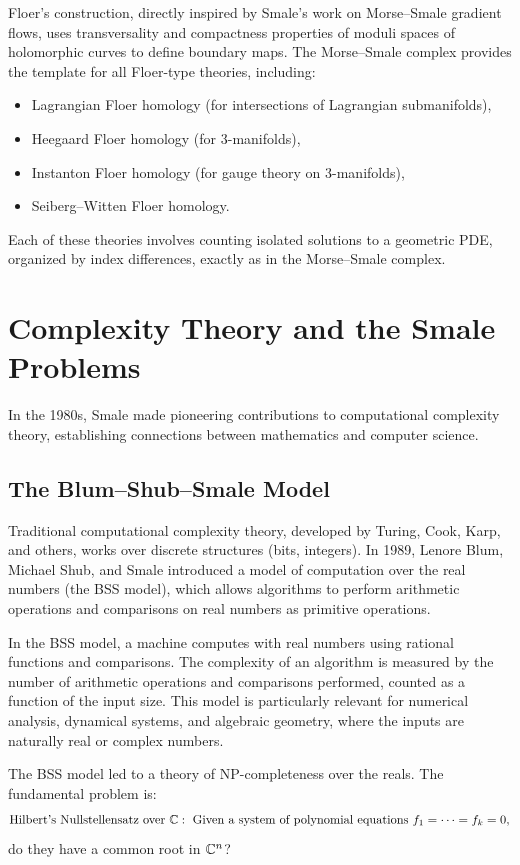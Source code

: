 Floer's construction, directly inspired by Smale's work on Morse--Smale gradient flows, uses transversality and compactness properties of moduli spaces of holomorphic curves to define boundary maps. The Morse--Smale complex provides the template for all Floer-type theories, including:
\begin{itemize}
    \item Lagrangian Floer homology (for intersections of Lagrangian submanifolds),
    \item Heegaard Floer homology (for 3-manifolds),
    \item Instanton Floer homology (for gauge theory on 3-manifolds),
    \item Seiberg--Witten Floer homology.
\end{itemize}

Each of these theories involves counting isolated solutions to a geometric PDE, organized by index differences, exactly as in the Morse--Smale complex.

\section{Complexity Theory and the Smale Problems}

In the 1980s, Smale made pioneering contributions to computational complexity theory, establishing connections between mathematics and computer science.

\subsection{The Blum--Shub--Smale Model}

Traditional computational complexity theory, developed by Turing, Cook, Karp, and others, works over discrete structures (bits, integers). In 1989, Lenore Blum, Michael Shub, and Smale introduced a model of computation over the real numbers (the BSS model), which allows algorithms to perform arithmetic operations and comparisons on real numbers as primitive operations.

In the BSS model, a machine computes with real numbers using rational functions and comparisons. The complexity of an algorithm is measured by the number of arithmetic operations and comparisons performed, counted as a function of the input size. This model is particularly relevant for numerical analysis, dynamical systems, and algebraic geometry, where the inputs are naturally real or complex numbers.

The BSS model led to a theory of NP-completeness over the reals. The fundamental problem is:
\[
\text{Hilbert's Nullstellensatz over } \mathbb{C}: \text{ Given a system of polynomial equations } f_1 = \cdots = f_k = 0,
\]
do they have a common root in \(\mathbb{C}^n\)?

